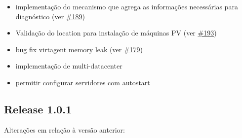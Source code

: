 \begin{itemize}
	\item implementação do mecanismo que agrega as informações necessárias para diagnóstico (ver \href{https://srcmaster.eurotux.com/pm/p/etva/ticket/189}{\#189})
	\item Validação do location para instalação de máquinas PV (ver \href{https://srcmaster.eurotux.com/pm/p/etva/ticket/193}{\#193})
	\item bug fix virtagent memory leak (ver \href{https://srcmaster.eurotux.com/pm/p/etva/ticket/179}{\#179})
	\item implementação de multi-datacenter
	\item permitir configurar servidores com autostart
\end{itemize}

\subsection{Release 1.0.1}

Alterações em relação à versão anterior: 

